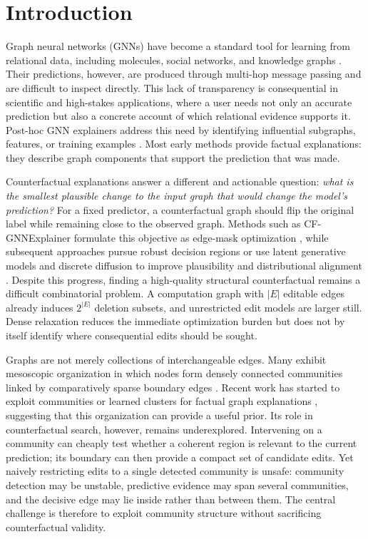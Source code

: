 \documentclass[runningheads]{llncs}
\begin{document}
\section{Introduction}
\label{sec:introduction}

Graph neural networks (GNNs) have become a standard tool for learning from
relational data, including molecules, social networks, and knowledge graphs
\cite{kipf2017gcn,xu2019gin}. Their predictions, however, are produced through
multi-hop message passing and are difficult to inspect directly. This lack of
transparency is consequential in scientific and high-stakes applications,
where a user needs not only an accurate prediction but also a concrete account
of which relational evidence supports it. Post-hoc GNN explainers address this
need by identifying influential subgraphs, features, or training examples
\cite{ying2019gnnexplainer,luo2020pgexplainer,yuan2022survey}. Most early
methods provide factual
explanations: they describe graph components that support the prediction that
was made.

Counterfactual explanations answer a different and actionable question:
\emph{what is the smallest plausible change to the input graph that would
change the model's prediction?} For a fixed predictor, a counterfactual graph
should flip the original label while remaining close to the observed graph.
Methods such as CF-GNNExplainer formulate this objective as edge-mask
optimization \cite{lucic2022cfgnn}, while subsequent approaches pursue robust
decision regions or use latent generative models and discrete diffusion to
improve plausibility and distributional alignment
\cite{bajaj2021rcexplainer,ma2022clear,huang2023d4explainer}. Despite this
progress, finding a high-quality structural counterfactual remains a difficult
combinatorial problem. A computation graph with $|E|$ editable edges already
induces $2^{|E|}$ deletion subsets, and unrestricted edit models are larger
still. Dense relaxation reduces the immediate optimization burden but does not
by itself identify where consequential edits should be sought.

Graphs are not merely collections of interchangeable edges. Many exhibit
mesoscopic organization in which nodes form densely connected communities
linked by comparatively sparse boundary edges \cite{fortunato2010community}.
Recent work has started to exploit communities or learned clusters for factual
graph explanations \cite{amato2026geco,yang2026ciflow}, suggesting that this
organization can provide a useful prior. Its role in counterfactual search,
however, remains underexplored. Intervening on a community can cheaply test
whether a coherent region is relevant to the current prediction; its boundary
can then provide a compact set of candidate edits. Yet naively restricting
edits to a single detected community is unsafe:
community detection may be unstable, predictive evidence may span several
communities, and the decisive edge may lie inside rather than between them.
The central challenge is therefore to exploit community structure without
sacrificing counterfactual validity.
\end{document}
